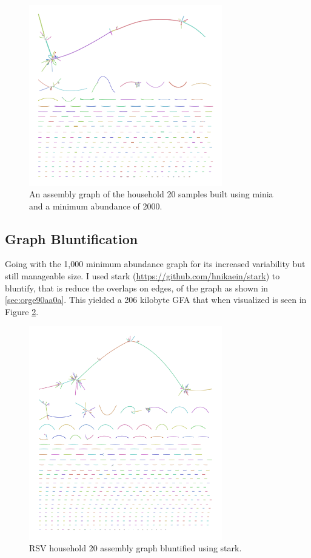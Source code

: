 \documentclass[10pt, a4paper]{article}
\begin{document}
\begin{figure}
\centering
\includegraphics[width=0.75\textwidth]{../Figures/RSV/Assembly_2000.png}
\caption[RSV Assembly Graph]{\label{fig:org52c0054}An assembly graph of the household 20 samples built using minia and a minimum abundance of 2000.}
\end{figure}

\subsection{Graph Bluntification}
\label{sec:org7ec34b7}
Going with the 1,000 minimum abundance graph for its increased variability but 
still manageable size. I used stark (\url{https://github.com/hnikaein/stark}) to 
bluntify, that is reduce the overlaps on edges,
\cite{gargGraphbasedApproachDiploid2018} of the graph as shown in
\ref{sec:orge90aa0a}.
This yielded a 206 kilobyte GFA that when visualized is seen in Figure
\ref{fig:org224afa7}.

\begin{figure}
\centering
\includegraphics[width=0.75\textwidth]{../Figures/RSV/Assembly_Bluntified.png}
\caption[Bluntified RSV Assembly Graph]{\label{fig:org224afa7}RSV household 20 assembly graph bluntified using stark.}
\end{figure}
\end{document}
